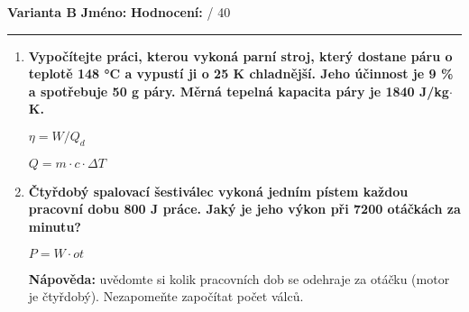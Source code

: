 \documentclass[../main.tex]{subfiles}
\begin{document}
\newpage
\textbf{Varianta B}
\hfill
\textbf{Jméno:}
\tecky{6cm}
\hspace{0.5cm}
\textbf{Hodnocení:}
\tecky{0.5cm}
{/}
{40}
\vspace{0.25cm}
\hrule
\vspace{0.25cm}

\begin{enumerate}[label={\textbf{\arabic*.}}, resume]

    \item \textbf{Vypočítejte práci, kterou vykoná parní stroj, který dostane páru o teplotě 148 °C a vypustí ji o 25 K chladnější. Jeho účinnost je 9 \% a spotřebuje 50 g páry. Měrná tepelná kapacita páry je 1840 J/kg\(\cdot\)K.}
    \vspace{-0.75cm}
    \begin{flushright}
        \begin{minipage}{0.16\textwidth}
            \begin{tcolorbox}[colframe=black, colback=white, boxrule=0.6pt]
                {$\eta=W/Q_d$}
            \end{tcolorbox}
        \end{minipage}
        \begin{minipage}{0.18\textwidth}
            \begin{tcolorbox}[colframe=black, colback=white, boxrule=0.6pt]
                {$Q=m\cdot{c}\cdot{\Delta{T}}$}
            \end{tcolorbox}
        \end{minipage}
    \end{flushright}
    \vspace{4cm}
    \item \textbf{Čtyřdobý spalovací šestiválec vykoná jedním pístem každou pracovní dobu 800 J práce. Jaký je jeho výkon při 7200 otáčkách za minutu?}
    \vspace{-0.75cm}
    \begin{flushright}
        \begin{minipage}{0.16\textwidth}
            \begin{tcolorbox}[colframe=black, colback=white, boxrule=0.6pt]
                {$P=W\cdot{ot}$}
            \end{tcolorbox}
        \end{minipage}
    \end{flushright}
    \vspace{4cm}
    \begin{minipage}{0.7\textwidth}
        \small{\textbf{Nápověda: }uvědomte si kolik pracovních dob se odehraje za otáčku (motor je čtyřdobý). Nezapomeňte započítat počet válců.}

\end{minipage}
\end{enumerate}
\end{document}
